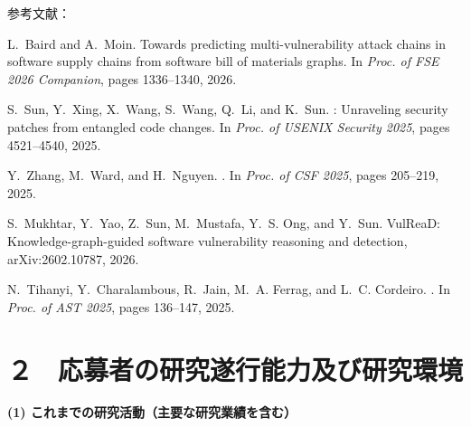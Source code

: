 \documentclass[11pt,a4j,dvipdfmx]{jarticle} 					%
\newcommand{\研究課題名}{大量の脆弱性・攻撃手段・パッチの依存関係を考慮した証明付き修正計画の自動生成}
\newcommand{\研究機関名}{電気通信大学}
\newcommand{\研究代表者氏名}{田原 康之}
\newcommand{\研究期間の最終元号年度}{12}  %
\begin{document}
\noindent 参考文献：
\begin{enumerate}
  \setlength{\parskip}{0mm} %
  \setlength{\itemsep}{0mm} %
  \setlength{\baselineskip}{.92\baselineskip}
L.~Baird and A.~Moin.
\newblock Towards predicting multi-vulnerability attack chains in software
  supply chains from software bill of materials graphs.
\newblock In {\em Proc. of {FSE} 2026 Companion}, pages
  1336--1340, 2026.

S.~Sun, Y.~Xing, X.~Wang, S.~Wang, Q.~Li, and K.~Sun.
: Unraveling security patches from entangled code changes.
\newblock In {\em Proc. of {USENIX} Security 2025}, pages 4521--4540, 2025.

Y.~Zhang, M.~Ward, and H.~Nguyen.
.
\newblock In {\em Proc. of {CSF} 2025}, pages 205--219, 2025.

S.~Mukhtar, Y.~Yao, Z.~Sun, M.~Mustafa, Y.~S. Ong, and Y.~Sun.
\newblock VulReaD: Knowledge-graph-guided software vulnerability reasoning and
  detection, arXiv:2602.10787, 2026.

N.~Tihanyi, Y.~Charalambous, R.~Jain, M.~A. Ferrag, and L.~C. Cordeiro.
.
\newblock In {\em Proc. of {AST} 2025}, pages 136--147, 2025.
\end{enumerate}




\section{２　応募者の研究遂行能力及び研究環境}


\noindent\textbf{(1) これまでの研究活動（主要な研究業績を含む）}
\end{document}
